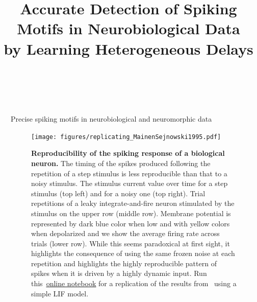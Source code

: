 \documentclass[final]{beamer}
\title{Accurate Detection of Spiking Motifs in Neurobiological Data \\ by Learning Heterogeneous Delays
}
\author{\FirstLP\  \LastLP}
\institute[shortinst]{\Department, \Affiliation,  \Street, \City\,\Country}
\newlength{\sepwidth}
\newlength{\colwidth}
\newcommand{\separatorcolumn}{\begin{column}{\sepwidth}\end{column}}
\begin{document}
 \justifying 
 
\begin{frame}[t]
\begin{columns}[t]
\separatorcolumn

\begin{column}{\colwidth}

  \begin{block}{Precise spiking motifs in neurobiological and neuromorphic data~\parencite{Grimaldi22polychronies}}


\begin{figure}[H]
\texttt{[image: figures/replicating\_MainenSejnowski1995.pdf]} 
\caption{
 \justifying 
 \textbf{Reproducibility of the spiking response of a biological neuron.} 
The timing of the spikes produced following the repetition of a step stimulus is less reproducible than that to a noisy stimulus. The stimulus current value over time for a step stimulus (top left) and for a noisy one (top right). Trial repetitions of a leaky integrate-and-fire neuron stimulated by the stimulus on the upper row (middle row). Membrane potential is represented by dark blue color when low and with yellow colors when depolarized and we show the average firing rate across trials (lower row). While this seems paradoxical at first sight, it highlights the consequence of using the same frozen noise at each repetition and highlights the highly reproducible pattern of spikes when it is driven by a highly dynamic input. Run this~\underline{\href{https://github.com/laurentperrinet/2022_UE-neurosciences-computationnelles/blob/master/C_MainenSejnowski1995_Perrinet.ipynb}{online notebook}}  for a replication of the results from~\parencite{mainen_reliability_1995} using a simple LIF model.}\label{fig:mainen}
\end{figure}
    



\end{block}
\end{column}
\end{columns}
\end{frame}
\end{document}
